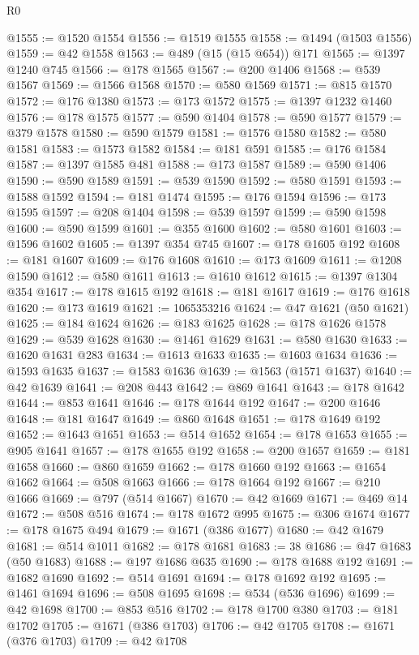 \begin{lexlean}{R0}
\begin{coremodule}
@1555 := @1520 @1554
@1556 := @1519 @1555
@1558 := @1494 (@1503 @1556)
@1559 := @42 @1558
@1563 := @489 (@15 (@15 @654)) @171
@1565 := @1397 @1240 @745
@1566 := @178 @1565
@1567 := @200 @1406
@1568 := @539 @1567
@1569 := @1566 @1568
@1570 := @580 @1569
@1571 := @815 @1570
@1572 := @176 @1380
@1573 := @173 @1572
@1575 := @1397 @1232 @1460
@1576 := @178 @1575
@1577 := @590 @1404
@1578 := @590 @1577
@1579 := @379 @1578
@1580 := @590 @1579
@1581 := @1576 @1580
@1582 := @580 @1581
@1583 := @1573 @1582
@1584 := @181 @591
@1585 := @176 @1584
@1587 := @1397 @1585 @481
@1588 := @173 @1587
@1589 := @590 @1406
@1590 := @590 @1589
@1591 := @539 @1590
@1592 := @580 @1591
@1593 := @1588 @1592
@1594 := @181 @1474
@1595 := @176 @1594
@1596 := @173 @1595
@1597 := @208 @1404
@1598 := @539 @1597
@1599 := @590 @1598
@1600 := @590 @1599
@1601 := @355 @1600
@1602 := @580 @1601
@1603 := @1596 @1602
@1605 := @1397 @354 @745
@1607 := @178 @1605 @192
@1608 := @181 @1607
@1609 := @176 @1608
@1610 := @173 @1609
@1611 := @1208 @1590
@1612 := @580 @1611
@1613 := @1610 @1612
@1615 := @1397 @1304 @354
@1617 := @178 @1615 @192
@1618 := @181 @1617
@1619 := @176 @1618
@1620 := @173 @1619
@1621 := 1065353216
@1624 := @47 @1621 (@50 @1621)
@1625 := @184 @1624
@1626 := @183 @1625
@1628 := @178 @1626 @1578
@1629 := @539 @1628
@1630 := @1461 @1629
@1631 := @580 @1630
@1633 := @1620 @1631 @283
@1634 := @1613 @1633
@1635 := @1603 @1634
@1636 := @1593 @1635
@1637 := @1583 @1636
@1639 := @1563 (@1571 @1637)
@1640 := @42 @1639
@1641 := @208 @443
@1642 := @869 @1641
@1643 := @178 @1642
@1644 := @853 @1641
@1646 := @178 @1644 @192
@1647 := @200 @1646
@1648 := @181 @1647
@1649 := @860 @1648
@1651 := @178 @1649 @192
@1652 := @1643 @1651
@1653 := @514 @1652
@1654 := @178 @1653
@1655 := @905 @1641
@1657 := @178 @1655 @192
@1658 := @200 @1657
@1659 := @181 @1658
@1660 := @860 @1659
@1662 := @178 @1660 @192
@1663 := @1654 @1662
@1664 := @508 @1663
@1666 := @178 @1664 @192
@1667 := @210 @1666
@1669 := @797 (@514 @1667)
@1670 := @42 @1669
@1671 := @469 @14
@1672 := @508 @516
@1674 := @178 @1672 @995
@1675 := @306 @1674
@1677 := @178 @1675 @494
@1679 := @1671 (@386 @1677)
@1680 := @42 @1679
@1681 := @514 @1011
@1682 := @178 @1681
@1683 := 38
@1686 := @47 @1683 (@50 @1683)
@1688 := @197 @1686 @635
@1690 := @178 @1688 @192
@1691 := @1682 @1690
@1692 := @514 @1691
@1694 := @178 @1692 @192
@1695 := @1461 @1694
@1696 := @508 @1695
@1698 := @534 (@536 @1696)
@1699 := @42 @1698
@1700 := @853 @516
@1702 := @178 @1700 @380
@1703 := @181 @1702
@1705 := @1671 (@386 @1703)
@1706 := @42 @1705
@1708 := @1671 (@376 @1703)
@1709 := @42 @1708

\end{coremodule}
\end{lexlean}
